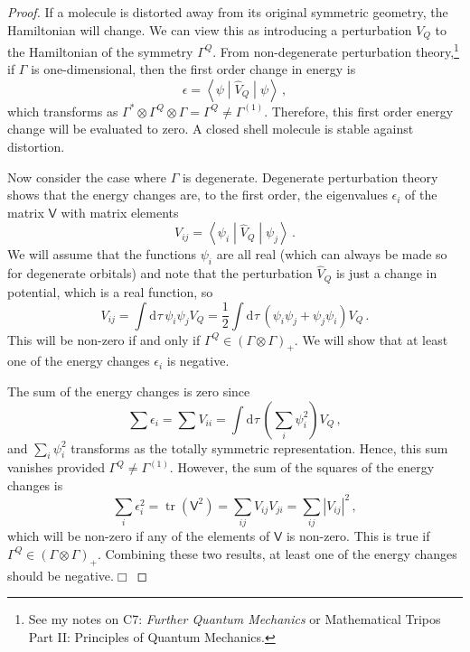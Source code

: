 \documentclass{article}
\theoremstyle{plain}\theoremheaderfont{\normalfont\itshape}\theorembodyfont{\rmfamily}\theoremseparator{.}\newtheorem*{rem}{Remark}\newtheorem*{ex}{Example}\newtheorem*{proof}{Proof}\newtheorem*{altp}{Alternative proof}
\theoremstyle{plain}\theoremheaderfont{\normalfont\bfseries}\theorembodyfont{\rmfamily}\theoremseparator{.}\newtheorem{thm}{Theorem}[section]\newtheorem{lem}[thm]{Lemma}\newtheorem{prop}[thm]{Proposition}\newtheorem*{cor}{Corollary}\newtheorem{defn}[thm]{Definition}\newtheorem{clm}[thm]{Claim}\newtheorem{clminproof}{Claim}\newtheorem*{law}{Law}\newtheorem{pos}[thm]{Postulate}
\theoremstyle{break}\theoremheaderfont{\normalfont\itshape}\theorembodyfont{\rmfamily}\theoremseparator{.\medskip}\newtheorem*{proofskip}{Proof}\newtheorem*{exs}{Examples}\newtheorem*{rems}{Remarks}
\theoremstyle{break}\theoremheaderfont{\normalfont\bfseries}\theorembodyfont{\rmfamily}\theoremseparator{.\medskip}\newtheorem{lemskip}[thm]{Lemma}\newtheorem{defnskip}[thm]{Definition}\newtheorem{propskip}[thm]{Proposition}\newtheorem{thmskip}[thm]{Theorem}
\numberwithin{equation}{section}
\newcommand{\qed}{\hfill\ensuremath{\Box}}
\newcommand{\dd}[2][]{\mathrm{d}^{#1} #2\,}
\newcommand{\mel}[3]{\left\langle #1 \middle| #2 \middle| #3 \right\rangle}
\newcommand{\abs}[1]{\left| #1 \right|}
\DeclareMathOperator{\tr}{tr}
\begin{document}
    \begin{proof}
        If a molecule is distorted away from its original symmetric geometry, the Hamiltonian will change. We can view this as introducing a perturbation \(V_Q\) to the Hamiltonian of the symmetry \(\Gamma^Q\). From non-degenerate perturbation theory,\footnote{See my notes on C7: \textit{Further Quantum Mechanics} or Mathematical Tripos Part II: Principles of Quantum Mechanics.} if \(\Gamma\) is one-dimensional, then the first order change in energy is
        \begin{equation}
            \epsilon=\mel{\psi}{\hat{V}_Q}{\psi}\,,
        \end{equation}
        which transforms as \(\Gamma^*\otimes\Gamma^Q\otimes\Gamma=\Gamma^Q\ne\Gamma^{(1)}\). Therefore, this first order energy change will be evaluated to zero. A closed shell molecule is stable against distortion.

        Now consider the case where \(\Gamma\) is degenerate. Degenerate perturbation theory shows that the energy changes are, to the first order, the eigenvalues \(\epsilon_i\) of the matrix \(\mathsf{V}\) with matrix elements
        \begin{equation}
            V_{ij}=\mel{\psi_i}{\hat{V}_Q}{\psi_j}\,.
        \end{equation}
        We will assume that the functions \(\psi_i\) are all real (which can always be made so for degenerate orbitals) and note that the perturbation \(\hat{V}_Q\) is just a change in potential, which is a real function, so
        \begin{equation}
            V_{ij}=\int\dd{\tau}\psi_i\psi_jV_Q=\frac{1}{2}\int\dd{\tau}(\psi_i\psi_j+\psi_j\psi_i)V_Q\,.
        \end{equation}
        This will be non-zero if and only if \(\Gamma^Q\in(\Gamma\otimes\Gamma)_+\). We will show that at least one of the energy changes \(\epsilon_i\) is negative.

        The sum of the energy changes is zero since
        \begin{equation}
            \sum\epsilon_i=\sum V_{ii}=\int\dd{\tau}\left(\sum_i\psi_i^2\right)V_Q\,,
        \end{equation}
        and \(\sum_i\psi_i^2\) transforms as the totally symmetric representation. Hence, this sum vanishes provided \(\Gamma^Q\ne\Gamma^{(1)}\). However, the sum of the squares of the energy changes is
        \begin{equation}
            \sum_i\epsilon_i^2=\tr(\mathsf{V}^2)=\sum_{ij}V_{ij}V_{ji}=\sum_{ij}\abs{V_{ij}}^2\,,
        \end{equation}
        which will be non-zero if any of the elements of \(\mathsf{V}\) is non-zero. This is true if \(\Gamma^Q\in(\Gamma\otimes\Gamma)_+\). Combining these two results, at least one of the energy changes should be negative.\qed        
    \end{proof}
\end{document}
